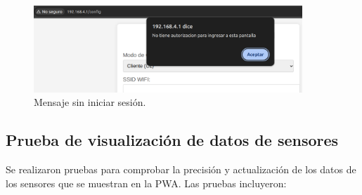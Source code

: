 \begin{itemize}
\begin{figure}[H]
\centering 
\includegraphics[width=0.9\textwidth]{./Figures/ingreso_inv.png}
\caption{Mensaje sin iniciar sesión.}
\label{fig:ingreso_inv}
\end{figure}

\end{itemize} 
   


\subsection{Prueba de visualización de datos de sensores}

Se realizaron pruebas para comprobar la precisión y actualización de los datos de los sensores que se muestran en la PWA. Las pruebas incluyeron:

